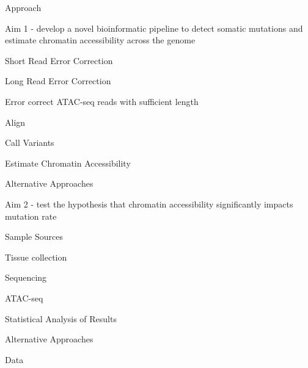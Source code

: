 \begin{outline}
\begin{outline}
	\end{outline}
	\item Approach
	\begin{outline}
		\item Aim 1 - develop a novel bioinformatic pipeline to detect somatic mutations and estimate chromatin accessibility across the genome
			\begin{outline}
				\item Short Read Error Correction
				\item Long Read Error Correction
				\item Error correct ATAC-seq reads with sufficient length
				\item Align
				\item Call Variants
				\item Estimate Chromatin Accessibility
				\item Alternative Approaches
			\end{outline}
		\item Aim 2 - test the hypothesis that chromatin accessibility significantly impacts mutation rate
			\begin{outline}
				\item Sample Sources
				\item Tissue collection
				\item Sequencing
				\item ATAC-seq
				\item Statistical Analysis of Results
				\item Alternative Approaches
				\item Data
			\end{outline}
	\end{outline}
\end{outline}
\medskip

\printbibliography














